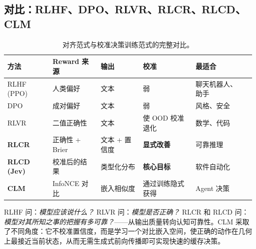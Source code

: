 \subsection{对比：RLHF、DPO、RLVR、RLCR、RLCD、CLM}
\label{subsec:calibration-comparison}

\begin{table}[ht!]
\centering
\caption{对齐范式与校准决策训练范式的完整对比。}
{\small
\begin{tabular}{@{}llllll@{}}
\toprule
\textbf{方法} & \textbf{Reward 来源} & \textbf{输出} & \textbf{校准} & \textbf{最适合} \\
\midrule
RLHF (PPO) & 人类偏好 & 文本 & 弱 & 聊天机器人、助手 \\
DPO & 成对偏好 & 文本 & 弱 & 风格、安全 \\
RLVR & 二值正确性 & 文本 & 使 OOD 校准退化 & 数学、代码 \\
\textbf{RLCR} & 正确性 + Brier & 文本 + 置信度 & \textbf{显式改善} & 可靠推理 \\
\textbf{RLCD (Jev)} & 校准后的结果 & 类型化分布 & \textbf{核心目标} & 软件自动化 \\
\textbf{CLM} & InfoNCE 对比 & 嵌入相似度 & 通过训练隐式获得 & Agent 决策 \\
\bottomrule
\end{tabular}
}
\end{table}

\begin{intuitionbox}[校准转向]
RLHF 问：\emph{模型应该说什么？} RLVR 问：\emph{模型是否正确？} RLCR 和 RLCD 问：\emph{模型对其所知之事的把握有多可靠？}——从输出质量转向认知可靠性。CLM 采取了不同角度：它不校准置信度，而是学习一个对比嵌入空间，使正确的动作在几何上最接近当前状态，从而无需生成式前向传播即可实现快速的缓存决策。
\end{intuitionbox}

